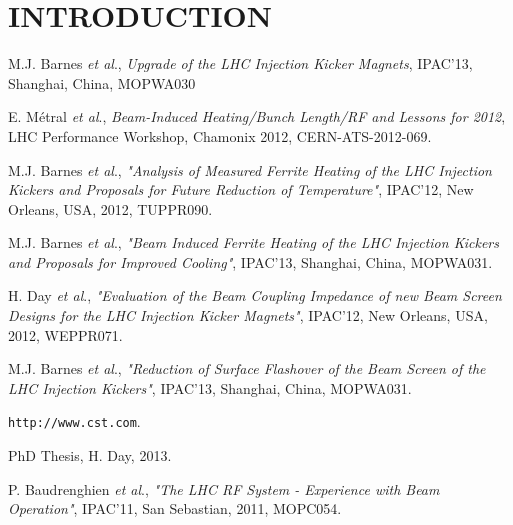 \documentclass[a4paper,
              ]{jacow}
\begin{document}
\section{INTRODUCTION}


\begin{thebibliography}{9}

M.J. Barnes \emph{et al}., \emph{Upgrade of the LHC Injection Kicker Magnets}, IPAC'13, Shanghai, China, MOPWA030

E. Métral \emph{et al}., \emph{Beam-Induced Heating/Bunch Length/RF and Lessons for 2012}, LHC Performance Workshop, Chamonix 2012, CERN-ATS-2012-069. 

M.J. Barnes \emph{et al}., \emph{"Analysis of Measured Ferrite Heating of the LHC Injection Kickers and Proposals for Future Reduction of Temperature"}, IPAC'12, New Orleans, USA, 2012, TUPPR090.

M.J. Barnes \emph{et al}., \emph{"Beam Induced Ferrite Heating of the LHC Injection Kickers and Proposals for Improved Cooling"}, IPAC'13, Shanghai, China, MOPWA031.

H. Day \emph{et al}., \emph{"Evaluation of the Beam Coupling Impedance of new Beam Screen Designs for the LHC Injection Kicker Magnets"}, IPAC'12, New Orleans, USA, 2012, WEPPR071.

M.J. Barnes \emph{et al}., \emph{"Reduction of Surface Flashover of the Beam Screen of the LHC Injection Kickers"}, IPAC'13, Shanghai, China, MOPWA031.

\texttt{http://www.cst.com}.

PhD Thesis, H. Day, 2013.

P. Baudrenghien \emph{et al}., \emph{"The LHC RF System - Experience with Beam Operation"}, IPAC'11, San Sebastian, 2011, MOPC054.


\end{thebibliography}
\end{document}
